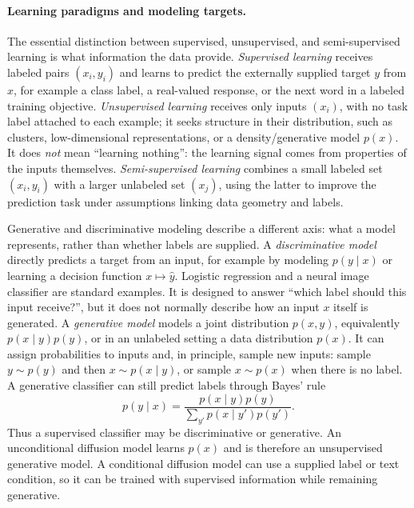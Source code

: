 \documentclass[11pt,a4paper]{article}
\theoremstyle{definition}
\begin{document}
\paragraph{Learning paradigms and modeling targets.}
The essential distinction between supervised, unsupervised, and semi-supervised learning is
what information the data provide. \emph{Supervised learning} receives labeled pairs
$(x_i,y_i)$ and learns to predict the externally supplied target $y$ from $x$, for example
a class label, a real-valued response, or the next word in a labeled training objective.
\emph{Unsupervised learning} receives only inputs $(x_i)$, with no task label attached to
each example; it seeks structure in their distribution, such as clusters,
low-dimensional representations, or a density/generative model $p(x)$. It does \emph{not}
mean ``learning nothing'': the learning signal comes from properties of the inputs
themselves. \emph{Semi-supervised learning} combines a small labeled set $(x_i,y_i)$ with
a larger unlabeled set $(x_j)$, using the latter to improve the prediction task under
assumptions linking data geometry and labels.

Generative and discriminative modeling describe a different axis: what a model represents,
rather than whether labels are supplied. A \emph{discriminative model} directly predicts a
target from an input, for example by modeling $p(y\mid x)$ or learning a decision function
$x\mapsto\widehat y$. Logistic regression and a neural image classifier are standard
examples. It is designed to answer ``which label should this input receive?'', but it does
not normally describe how an input $x$ itself is generated. A \emph{generative model}
models a joint distribution $p(x,y)$, equivalently $p(x\mid y)p(y)$, or in an unlabeled
setting a data distribution $p(x)$. It can assign probabilities to inputs and, in
principle, sample new inputs: sample $y\sim p(y)$ and then $x\sim p(x\mid y)$, or sample
$x\sim p(x)$ when there is no label. A generative classifier can still predict labels
through Bayes' rule
\[
p(y\mid x)=\frac{p(x\mid y)p(y)}{\sum_{y'}p(x\mid y')p(y')}.
\]
Thus a supervised classifier may be discriminative or generative. An unconditional
diffusion model learns $p(x)$ and is therefore an unsupervised generative model. A
conditional diffusion model can use a supplied label or text condition, so it can be
trained with supervised information while remaining generative.
\end{document}
